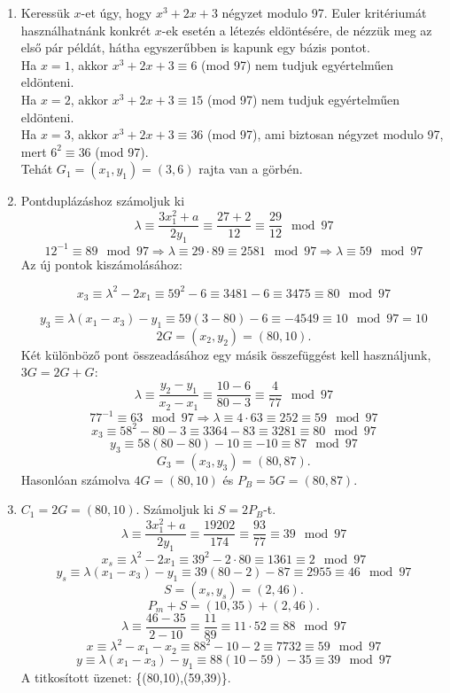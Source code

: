 \begin{solution}
\begin{enumerate}
\item Keressük $x$-et úgy, hogy $x^{3}+2x+3$ négyzet modulo 97. Euler
kritériumát használhatnánk konkrét $x$-ek esetén a létezés eldöntésére,
de nézzük meg az első pár példát, hátha egyszerűbben is kapunk egy
bázis pontot.\\
 Ha $x=1$, akkor $x^{3}+2x+3\equiv6$ (mod 97) nem tudjuk egyértelműen
eldönteni.\\
 Ha $x=2$, akkor $x^{3}+2x+3\equiv15$ (mod 97) nem tudjuk egyértelműen
eldönteni.\\
 Ha $x=3$, akkor $x^{3}+2x+3\equiv36$ (mod 97), ami biztosan négyzet
modulo 97, mert $6^{2}\equiv36$ (mod 97).\\
 Tehát $G_{1}=(x_{1},y_{1})=(3,6)$ rajta van a görbén. 
\item Pontduplázáshoz számoljuk ki 
\[
\lambda\equiv\frac{3x_{1}^{2}+a}{2y_{1}}\equiv\frac{27+2}{12}\equiv\frac{29}{12}\mod 97
\]
\[
12^{-1}\equiv89\mod 97\Rightarrow\lambda\equiv29\cdot89\equiv2581\mod 97\Rightarrow\lambda\equiv59\mod 97
\]
Az új pontok kiszámolásához:

\[
x_{3}\equiv\lambda^{2}-2x_{1}\equiv59^{2}-6\equiv3481-6\equiv3475\equiv80\mod 97
\]

\[
y_{3}\equiv\lambda(x_{1}-x_{3})-y_{1}\equiv59(3-80)-6\equiv-4549\equiv10\mod 97=10
\]
\[
2G=(x_{2},y_{2})=(80,10).
\]
Két különböző pont összeadásához egy másik összefüggést kell használjunk,
$3G=2G+G$: 
\[
\lambda\equiv\frac{y_{2}-y_{1}}{x_{2}-x_{1}}\equiv\frac{10-6}{80-3}\equiv\frac{4}{77}\mod 97
\]
\[
77^{-1}\equiv63\mod 97\Rightarrow\lambda\equiv4\cdot63\equiv252\equiv59\mod 97
\]
\[
x_{3}\equiv58^{2}-80-3\equiv3364-83\equiv3281\equiv80\mod 97
\]
\[
y_{3}\equiv58(80-80)-10\equiv-10\equiv87\mod 97
\]
\[
G_{3}=(x_{3},y_{3})=(80,87).
\]
Hasonlóan számolva $4G=(80,10)$ és $P_{B}=5G=(80,87)$. 
\item $C_{1}=2G=(80,10).$ Számoljuk ki $S=2P_{B}$-t. 
\[
\lambda\equiv\frac{3x_{1}^{2}+a}{2y_{1}}\equiv\frac{19202}{174}\equiv\frac{93}{77}\equiv39\mod 97
\]
\[
x_{s}\equiv\lambda^{2}-2x_{1}\equiv39^{2}-2\cdot80\equiv1361\equiv2\mod 97
\]
\[
y_{s}\equiv\lambda(x_{1}-x_{3})-y_{1}\equiv39(80-2)-87\equiv2955\equiv46\mod 97
\]
\[
S=(x_{s},y_{s})=(2,46).
\]
\[
P_{m}+S=(10,35)+(2,46).
\]
\[
\lambda\equiv\frac{46-35}{2-10}\equiv\frac{11}{89}\equiv11\cdot52\equiv88\mod{97}
\]
\[
x\equiv\lambda^{2}-x_{1}-x_{2}\equiv88^{2}-10-2\equiv7732\equiv59\mod{97}
\]
\[
y\equiv\lambda(x_{1}-x_{3})-y_{1}\equiv88(10-59)-35\equiv39\mod{97}
\]
A titkosított üzenet: \{(80,10),(59,39)\}. 
\end{enumerate}
\end{solution}

